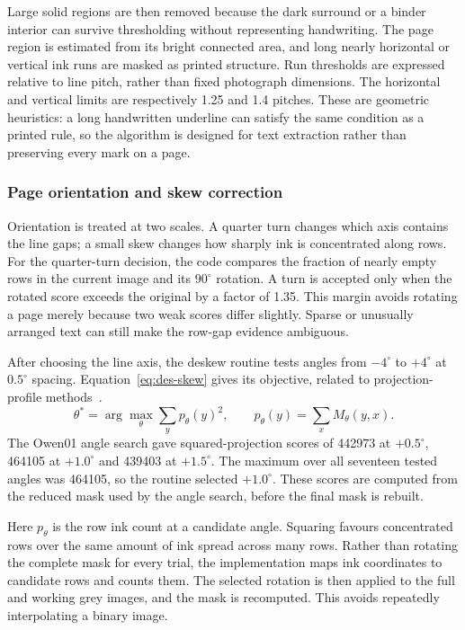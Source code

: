 Large solid regions are then removed because the dark surround or a binder interior can survive thresholding without representing handwriting. The page region is estimated from its bright connected area, and long nearly horizontal or vertical ink runs are masked as printed structure. Run thresholds are expressed relative to line pitch, rather than fixed photograph dimensions. The horizontal and vertical limits are respectively 1.25 and 1.4 pitches. These are geometric heuristics: a long handwritten underline can satisfy the same condition as a printed rule, so the algorithm is designed for text extraction rather than preserving every mark on a page.

\subsubsection{Page orientation and skew correction}
Orientation is treated at two scales. A quarter turn changes which axis contains the line gaps; a small skew changes how sharply ink is concentrated along rows. For the quarter-turn decision, the code compares the fraction of nearly empty rows in the current image and its $90^\circ$ rotation. A turn is accepted only when the rotated score exceeds the original by a factor of 1.35. This margin avoids rotating a page merely because two weak scores differ slightly. Sparse or unusually arranged text can still make the row-gap evidence ambiguous.

After choosing the line axis, the deskew routine tests angles from $-4^\circ$ to $+4^\circ$ at $0.5^\circ$ spacing. Equation~\ref{eq:des-skew} gives its objective, related to projection-profile methods~\cite{postl1986}.
\begin{equation}
\theta^*=\arg\max_\theta\sum_y p_\theta(y)^2,\qquad
p_\theta(y)=\sum_x M_\theta(y,x).
\label{eq:des-skew}
\end{equation}
The Owen01 angle search gave squared-projection scores of 442973 at $+0.5^\circ$, 464105 at $+1.0^\circ$ and 439403 at $+1.5^\circ$. The maximum over all seventeen tested angles was 464105, so the routine selected $+1.0^\circ$. These scores are computed from the reduced mask used by the angle search, before the final mask is rebuilt.

Here $p_\theta$ is the row ink count at a candidate angle. Squaring favours concentrated rows over the same amount of ink spread across many rows. Rather than rotating the complete mask for every trial, the implementation maps ink coordinates to candidate rows and counts them. The selected rotation is then applied to the full and working grey images, and the mask is recomputed. This avoids repeatedly interpolating a binary image.

